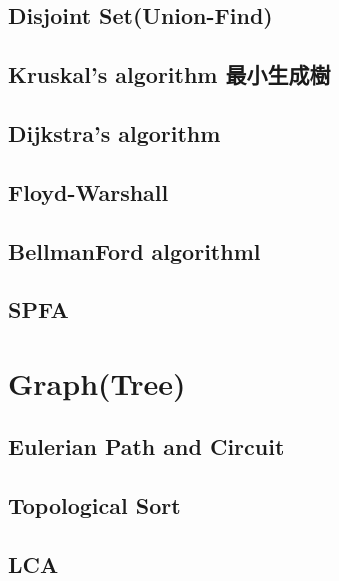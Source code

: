 \subsection{Disjoint Set(Union-Find)}


\subsection{Kruskal’s algorithm 最小生成樹}


\subsection{Dijkstra’s algorithm}


\subsection{Floyd-Warshall}


\subsection{BellmanFord algorithml}


\subsection{SPFA}


\section{Graph(Tree)}

\subsection{Eulerian Path and Circuit}


\subsection{Topological Sort}


\subsection{LCA}


